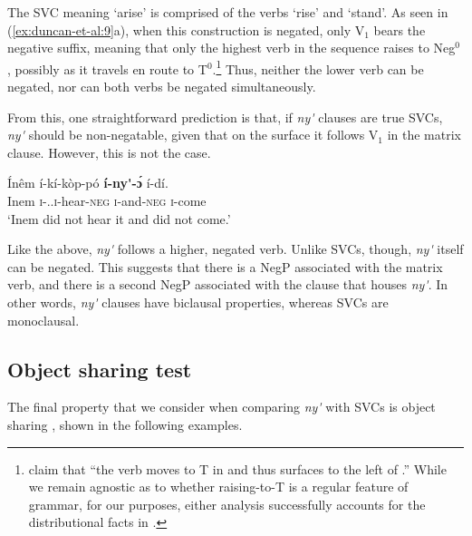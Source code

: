 \documentclass[output=paper
,newtxmath
,modfonts
,nonflat]{langsci/langscibook}
\begin{document}
\noindent The SVC meaning `arise' is comprised of the verbs `rise' and `stand'. As seen in (\ref{ex:duncan-et-al:9}a), when this construction is negated, only V$_1$ bears the negative suffix, meaning that only the highest verb in the sequence raises to Neg$^0$ \citep{duncan-toappear}, possibly as it travels en route to T$^0$.\footnote{\citet[120]{baker2010agreement} claim that ``the verb moves to T in  and thus surfaces to the left of .'' While we remain agnostic as to whether raising-to-T is a regular feature of  grammar, for our purposes, either analysis successfully accounts for the distributional facts in .} Thus, neither the lower verb can be negated, nor can both verbs be negated simultaneously. 

From this, one straightforward prediction is that, if \textit{ny\'{\textturnv}\ng} clauses are true SVCs, \textit{ny\'{\textturnv}\ng} should be non-negatable, given that on the surface it follows V$_1$ in the matrix clause. However, this is not the case.

\ea\label{ex:duncan-et-al:10}
\gll \'{I}n\^{e}m \'{i}-k\'{i}-k\`{o}p-p\'{o} \textbf{\'{i}-ny\'{\textturnv}\ng-\ng \'ɔ} \'{i}-d\'{i}. \\
Inem \textsc{i}-{\pst.\foc}.\textsc{i}-hear-\textsc{neg} \textsc{i}-and-\textsc{neg} \textsc{i}-come \\
\glt ‘Inem did not hear it and did not come.’ \citep[86]{essien1985negation}
\z

\noindent Like the  above, \textit{ny\'{\textturnv}\ng} follows a higher, negated verb. Unlike SVCs, though, \textit{ny\'{\textturnv}\ng} itself can be negated. This suggests that there is a NegP associated with the matrix verb, and there is a second NegP associated with the clause that houses \textit{ny\'{\textturnv}\ng}. In other words, \textit{ny\'{\textturnv}\ng} clauses have biclausal properties, whereas SVCs are monoclausal.

\subsection{Object sharing test}\label{sec:duncan-et-al:2.4}

The final property that we consider when comparing \textit{ny\'{\textturnv}\ng} with SVCs is object sharing \citep{baker1989object}, shown in the following examples.
\end{document}
